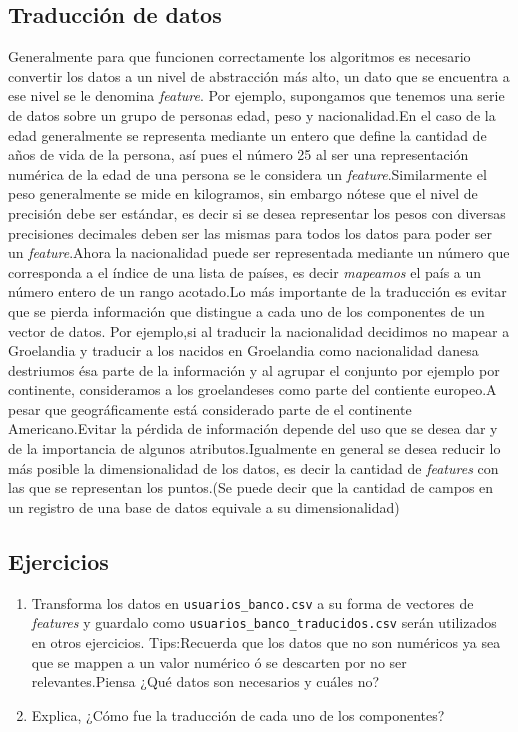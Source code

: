 \documentclass{article}
\begin{document}
\subsection{Traducción de datos}
Generalmente para que funcionen correctamente los algoritmos es necesario convertir los datos a un nivel de abstracción más alto, un dato que se encuentra a ese nivel se le denomina \textit{feature}.
Por ejemplo, supongamos que tenemos una serie de datos sobre un grupo de personas edad, peso y nacionalidad.En el caso de la edad generalmente se representa mediante un entero que define la cantidad de años de vida de la persona, así pues el número 25 al ser una representación numérica de la edad de una persona se le considera un \textit{feature}.Similarmente el peso generalmente se mide en kilogramos, sin embargo nótese que el nivel de precisión debe ser estándar, es decir si se desea representar los pesos con diversas precisiones decimales deben ser las mismas para todos los datos para poder ser un \textit{feature}.Ahora la nacionalidad puede ser representada mediante un número que corresponda a el índice de una lista de países, es decir \textit{mapeamos} el país a un número entero de un rango acotado.Lo más importante de la traducción es evitar que se pierda información que distingue a cada uno de los componentes de un vector de datos. Por ejemplo,si al traducir la nacionalidad decidimos no mapear a Groelandia y traducir a los nacidos en Groelandia como nacionalidad danesa destriumos ésa parte de la información y al agrupar el conjunto por ejemplo por continente, consideramos a los groelandeses como parte del contiente europeo.A pesar que geográficamente está considerado parte de el continente Americano.Evitar la pérdida de información depende del uso que se desea dar y de la importancia de algunos atributos.Igualmente en general se desea reducir lo más posible la dimensionalidad de los datos, es decir la cantidad de \textit{features} con las que se representan los puntos.(Se puede decir que la cantidad de campos en un registro de una base de datos equivale a su dimensionalidad)
\subsection{Ejercicios}
\begin{enumerate}
\item Transforma los datos en \verb#usuarios_banco.csv# a su forma de vectores de \textit{features} y guardalo como \verb#usuarios_banco_traducidos.csv# serán utilizados en otros ejercicios.
Tips:Recuerda que los datos que no son numéricos ya sea que se mappen a un valor numérico ó se descarten por no ser relevantes.Piensa ¿Qué datos son necesarios y cuáles no?
\item Explica, ¿Cómo fue la traducción de cada uno de los componentes?
\end{enumerate}
\end{document}
